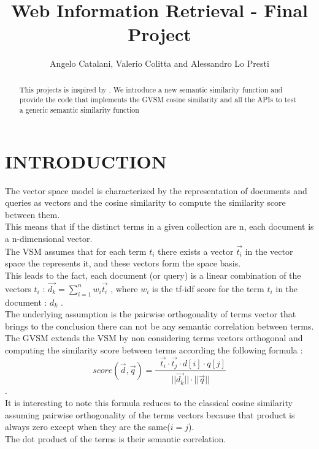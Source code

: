 \documentclass[letterpaper, 10 pt, conference]{ieeeconf}  %
\title{\LARGE \bf
Web Information Retrieval - Final Project
}
\author{Angelo Catalani, Valerio Colitta and Alessandro Lo Presti}%
\begin{document}
\maketitle
\thispagestyle{empty}
\pagestyle{empty}


\begin{abstract}

This projects is inspired by \cite{c1}. We introduce a new semantic similarity function and provide the code that implements the GVSM cosine similarity and all the APIs to test a generic semantic similarity function


\end{abstract}


\section{INTRODUCTION}

The vector space model is characterized by the representation of documents and queries as vectors and the cosine similarity to compute the similarity score between them.\\This means that if the distinct terms in a given collection are n, each document is a n-dimensional vector.\\The VSM assumes that for each term $t_i$ there exists a vector $\vec{t_i}$ in the vector space the represents it, and these vectors form the space basis.\\This leads to the fact, each document (or query) is a linear combination of the vectors $t_i$ : $\vec{d_k} = \sum\limits_{i=1}^n w_i\vec{t_i}$ , where $w_i$ is the tf-idf score for the term $t_i$ in the document : $d_k$  .\\The underlying assumption is the pairwise orthogonality of terms vector that brings to the conclusion there can not be any semantic correlation between terms.\\The GVSM extends the VSM by non considering terms vectors orthogonal and computing the similarity score between terms according the following formula : 
\begin{equation}
    score(\vec{d},\vec{q}) = \frac{\mathop{\sum_{j=1}^{n'}\sum_{i=1}^{n'}}\vec{t_i}\cdot\vec{t_j}\cdot d[i]\cdot q[j] }{||\vec{d_k} ||\cdot||\vec{q} ||}
\end{equation}.\\It is interesting to note this formula reduces to the classical cosine similarity assuming pairwise orthogonality of the terms vectors because that product is always zero except when they are the same($i=j$).\\The dot product of the terms is their semantic correlation.
\end{document}
